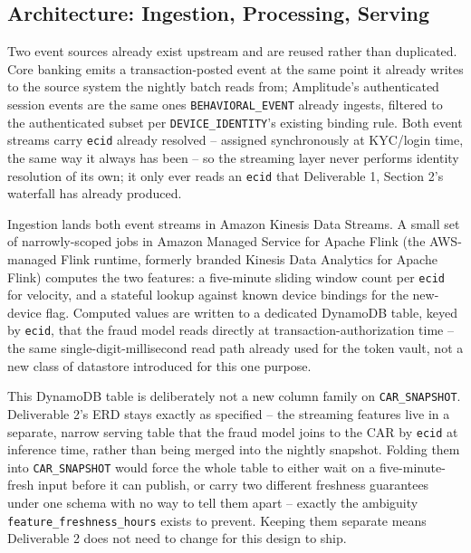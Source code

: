 \documentclass[11pt]{article}
\begin{document}
\subsection{Architecture: Ingestion, Processing, Serving}
Two event sources already exist upstream and are reused rather than duplicated. Core banking emits a transaction-posted event at the same point it already writes to the source system the nightly batch reads from; Amplitude's authenticated session events are the same ones \texttt{BEHAVIORAL\_EVENT} already ingests, filtered to the authenticated subset per \texttt{DEVICE\_IDENTITY}'s existing binding rule. Both event streams carry \texttt{ecid} already resolved -- assigned synchronously at KYC/login time, the same way it always has been -- so the streaming layer never performs identity resolution of its own; it only ever reads an \texttt{ecid} that Deliverable 1, Section 2's waterfall has already produced.

Ingestion lands both event streams in Amazon Kinesis Data Streams. A small set of narrowly-scoped jobs in Amazon Managed Service for Apache Flink (the AWS-managed Flink runtime, formerly branded Kinesis Data Analytics for Apache Flink) computes the two features: a five-minute sliding window count per \texttt{ecid} for velocity, and a stateful lookup against known device bindings for the new-device flag. Computed values are written to a dedicated DynamoDB table, keyed by \texttt{ecid}, that the fraud model reads directly at transaction-authorization time -- the same single-digit-millisecond read path already used for the token vault, not a new class of datastore introduced for this one purpose.

\begin{rationale}
This DynamoDB table is deliberately not a new column family on \texttt{CAR\_SNAPSHOT}. Deliverable 2's ERD stays exactly as specified -- the streaming features live in a separate, narrow serving table that the fraud model joins to the CAR by \texttt{ecid} at inference time, rather than being merged into the nightly snapshot. Folding them into \texttt{CAR\_SNAPSHOT} would force the whole table to either wait on a five-minute-fresh input before it can publish, or carry two different freshness guarantees under one schema with no way to tell them apart -- exactly the ambiguity \texttt{feature\_freshness\_hours} exists to prevent. Keeping them separate means Deliverable 2 does not need to change for this design to ship.
\end{rationale}
\end{document}
